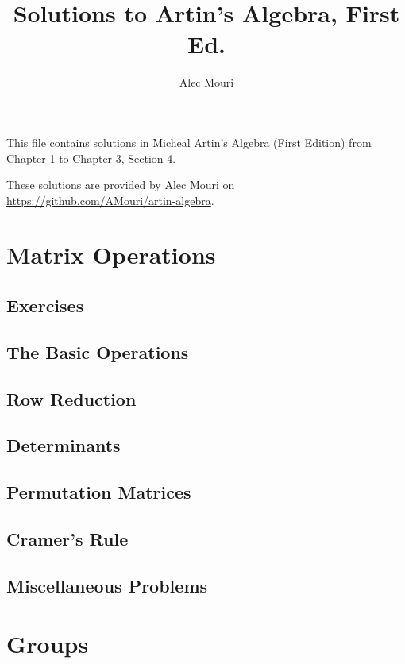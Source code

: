 \documentclass[]{book}
\begin{document}
\title{Solutions to Artin's Algebra, First Ed.}
\author{Alec Mouri}
\date{}
\frontmatter
\maketitle
This file contains solutions in Micheal Artin's Algebra (First Edition) from Chapter 1 to Chapter 3, Section 4.

These solutions are provided by Alec Mouri on \url{https://github.com/AMouri/artin-algebra}.
\tableofcontents
\mainmatter
\chapter{Matrix Operations}
\section*{Exercises}

\section{The Basic Operations}

\section{Row Reduction}

\section{Determinants}

\section{Permutation Matrices}

\section{Cramer's Rule}

\section{Miscellaneous Problems}


\chapter{Groups}
\end{document}
